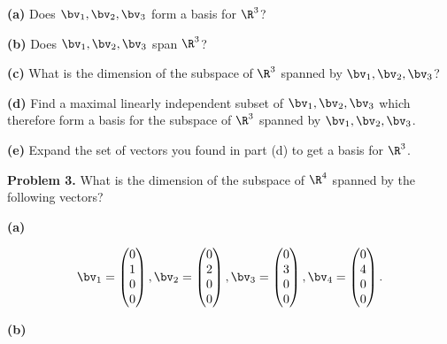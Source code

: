 \documentclass[oneside,12pt]{amsart}
\begin{document}
\textbf{(a)} Does $\bv_1,\bv_2,\bv_3$ form a basis for $\R^3$?

\bigskip
\bigskip
\bigskip
\bigskip



\textbf{(b)} Does $\bv_1,\bv_2,\bv_3$ span $\R^3$?

\bigskip
\bigskip
\bigskip
\bigskip

\textbf{(c)} What is the dimension of the subspace of $\R^3$ spanned by $\bv_1,\bv_2,\bv_3$?

\bigskip
\bigskip
\bigskip
\bigskip


\textbf{(d)} Find a maximal linearly independent subset of $\bv_1,\bv_2,\bv_3$ which
therefore form a basis for the subspace of $\R^3$ spanned by $\bv_1,\bv_2,\bv_3$.

\bigskip
\bigskip
\bigskip
\bigskip

\textbf{(e)} Expand the set of vectors you found in part (d) to get a basis for $\R^3$.

\bigskip
\bigskip
\bigskip
\bigskip


\textbf{Problem 3.} What is the dimension of the subspace of $\R^4$ spanned by the following vectors?


\textbf{(a)}

$$
\bv_1 =
\begin{pmatrix}
0 \\ 1 \\ 0 \\ 0
\end{pmatrix},
\bv_2 =
\begin{pmatrix}
0 \\ 2 \\ 0 \\ 0
\end{pmatrix},
\bv_3 =
\begin{pmatrix}
0 \\ 3 \\ 0 \\ 0
\end{pmatrix},
\bv_4 =
\begin{pmatrix}
0 \\ 4 \\ 0 \\ 0
\end{pmatrix}.
$$

\bigskip
\bigskip
\bigskip
\bigskip

\textbf{(b)}
\end{document}
